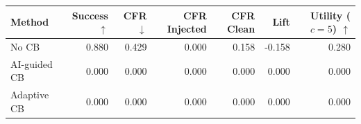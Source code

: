 \begin{tabular}{lrrrrrr}
\toprule
Method & Success $\uparrow$ & CFR $\downarrow$ & CFR Injected & CFR Clean & Lift & Utility ($c=5$) $\uparrow$ \\
\midrule
No CB & 0.880 & 0.429 & 0.000 & 0.158 & -0.158 & 0.280 \\
AI-guided CB & 0.000 & 0.000 & 0.000 & 0.000 & 0.000 & 0.000 \\
Adaptive CB & 0.000 & 0.000 & 0.000 & 0.000 & 0.000 & 0.000 \\
\bottomrule
\end{tabular}
